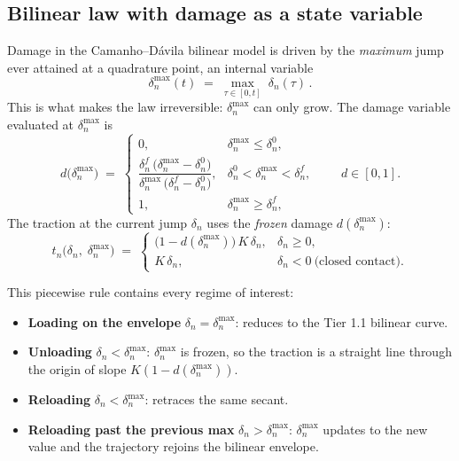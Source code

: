 \subsection{Bilinear law with damage as a state variable}

Damage in the Camanho--D{\'a}vila bilinear model is driven by the
\emph{maximum} jump ever attained at a quadrature point, an internal
variable
\begin{equation}
\delta_n^{\max}(t) \;=\; \max_{\tau\in[0,t]}\;\delta_n(\tau)\,.
\end{equation}
This is what makes the law irreversible: $\delta_n^{\max}$ can only grow.
The damage variable evaluated at $\delta_n^{\max}$ is
\begin{equation}
d\bigl(\delta_n^{\max}\bigr)
\;=\;
\begin{cases}
0,
& \delta_n^{\max} \le \delta_n^{0}, \\[6pt]
\dfrac{\delta_n^{f}\,\bigl(\delta_n^{\max}-\delta_n^{0}\bigr)}
       {\delta_n^{\max}\,\bigl(\delta_n^{f}-\delta_n^{0}\bigr)},
& \delta_n^{0} < \delta_n^{\max} < \delta_n^{f}, \\[10pt]
1,
& \delta_n^{\max} \ge \delta_n^{f},
\end{cases}
\qquad d\in[0,1].
\end{equation}
The traction at the current jump $\delta_n$ uses the \emph{frozen} damage
$d(\delta_n^{\max})$:
\begin{equation}
t_n\bigl(\delta_n,\;\delta_n^{\max}\bigr)
\;=\;
\begin{cases}
\bigl(1-d(\delta_n^{\max})\bigr)\,K\,\delta_n, & \delta_n \ge 0, \\[4pt]
K\,\delta_n, & \delta_n < 0\ \text{(closed contact)}.
\end{cases}
\end{equation}

This piecewise rule contains every regime of interest:
\begin{itemize}
\item \textbf{Loading on the envelope} $\delta_n=\delta_n^{\max}$:
      reduces to the Tier 1.1 bilinear curve.
\item \textbf{Unloading} $\delta_n<\delta_n^{\max}$:
      $\delta_n^{\max}$ is frozen, so the traction is a straight line
      through the origin of slope $K(1-d(\delta_n^{\max}))$.
\item \textbf{Reloading} $\delta_n<\delta_n^{\max}$:
      retraces the same secant.
\item \textbf{Reloading past the previous max} $\delta_n>\delta_n^{\max}$:
      $\delta_n^{\max}$ updates to the new value and the trajectory rejoins
      the bilinear envelope.
\end{itemize}

